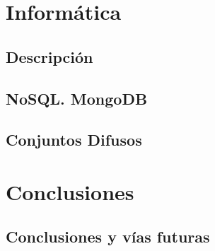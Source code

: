 \documentclass[ oneside,openany,titlepage,numbers=noenddot,headinclude,%
                footinclude=true,cleardoublepage=empty,abstractoff, %
                BCOR=5mm,paper=a4,fontsize=11pt,%
                spanish,american%
                ]{scrreprt}
\begin{document}
\part{Informática}

\chapter{Descripción}




\chapter{NoSQL. MongoDB}


\chapter{Conjuntos Difusos}


\part{Conclusiones}

\chapter{Conclusiones y vías futuras}


%
\cleardoublepage
\cleardoublepage
\cleardoublepage
\end{document}
